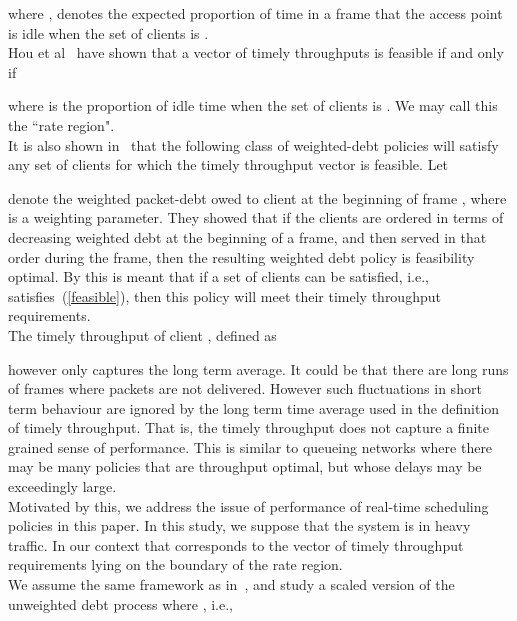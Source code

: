 \documentclass[letterpaper, 10 pt, conference]{ieeeconf}
\begin{document}
where , denotes the expected proportion of time in a frame that the access point is idle when the set of clients is .\\
Hou et al~\cite{c3} have shown that a vector  of timely throughputs is feasible if and only if

where  is the proportion of idle time when the set of clients is . We may call this the ``rate region".\\
It is also shown in~\cite{c3} that the following class of weighted-debt policies will satisfy any set of clients for which the timely throughput vector is feasible. Let
  
denote the weighted packet-debt owed to client  at the beginning of frame , where  is a weighting parameter. They showed that if the clients are ordered in terms of decreasing weighted debt at the beginning of a frame, and then served in that order during the frame, then the resulting weighted debt policy is feasibility optimal. By this is meant that if a set of clients can be satisfied, i.e., satisfies~(\ref{feasible}), then this policy will meet their timely throughput requirements.\\
The timely throughput of client , defined as 

however only captures the long term average. It could be that there are long runs of frames where packets are not delivered. However such fluctuations in short term behaviour are ignored by the long term time average used in the definition of timely throughput. That is, the timely throughput does not capture a finite grained sense of performance. This is similar to queueing networks where there may be many policies that are throughput optimal, but whose delays may be exceedingly large.\\
Motivated by this, we address the issue of performance of real-time scheduling policies in this paper. In this study, we suppose that the system is in heavy traffic. In our context that corresponds to the vector of timely throughput requirements lying on the boundary of the rate region.\\
We assume the same framework as in~\cite{c3}, and study a scaled version of the unweighted debt process where , i.e.,
\end{document}
